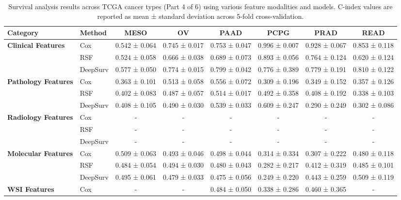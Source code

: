 \begin{sidewaystable}[htbp]
    \centering
    \caption{Survival analysis results across TCGA cancer types (Part 4 of 6) using various feature modalities and models. C-index values are reported as mean ± standard deviation across 5-fold cross-validation.}
    \label{tab:survival_results_4}
    \begin{tabular}{@{}llcccccc@{}}
        \toprule
        \textbf{Category} & \textbf{Method} & \textbf{MESO} & \textbf{OV} & \textbf{PAAD} & \textbf{PCPG} & \textbf{PRAD} & \textbf{READ} \\
        \midrule
        \multirow{3}{*}{\textbf{Clinical Features}} & Cox & 0.542 ± 0.064 & 0.745 ± 0.017 & 0.753 ± 0.047 & 0.996 ± 0.007 & 0.928 ± 0.067 & 0.853 ± 0.118 \\
        & RSF & 0.524 ± 0.058 & 0.666 ± 0.038 & 0.689 ± 0.073 & 0.893 ± 0.056 & 0.764 ± 0.124 & 0.620 ± 0.124 \\
        & DeepSurv & 0.577 ± 0.050 & 0.774 ± 0.015 & 0.799 ± 0.042 & 0.776 ± 0.389 & 0.779 ± 0.191 & 0.810 ± 0.122 \\
        \midrule
        \multirow{3}{*}{\textbf{Pathology Features}} & Cox & 0.363 ± 0.101 & 0.513 ± 0.058 & 0.556 ± 0.072 & 0.309 ± 0.196 & 0.349 ± 0.152 & 0.357 ± 0.126 \\
        & RSF & 0.402 ± 0.083 & 0.487 ± 0.057 & 0.514 ± 0.017 & 0.492 ± 0.358 & 0.408 ± 0.192 & 0.338 ± 0.103 \\
        & DeepSurv & 0.408 ± 0.105 & 0.490 ± 0.030 & 0.539 ± 0.033 & 0.609 ± 0.247 & 0.290 ± 0.249 & 0.302 ± 0.086 \\
        \midrule
        \multirow{3}{*}{\textbf{Radiology Features}} & Cox & - & - & - & - & - & - \\
        & RSF & - & - & - & - & - & - \\
        & DeepSurv & - & - & - & - & - & - \\
        \midrule
        \multirow{3}{*}{\textbf{Molecular Features}} & Cox & 0.509 ± 0.063 & 0.493 ± 0.046 & 0.498 ± 0.044 & 0.314 ± 0.334 & 0.307 ± 0.222 & 0.480 ± 0.118 \\
        & RSF & 0.484 ± 0.054 & 0.494 ± 0.030 & 0.480 ± 0.043 & 0.282 ± 0.217 & 0.412 ± 0.319 & 0.485 ± 0.101 \\
        & DeepSurv & 0.495 ± 0.061 & 0.479 ± 0.033 & 0.475 ± 0.056 & 0.249 ± 0.220 & 0.443 ± 0.259 & 0.509 ± 0.119 \\
        \midrule
        \multirow{3}{*}{\textbf{WSI Features}} & Cox & - & - & 0.484 ± 0.050 & 0.338 ± 0.286 & 0.460 ± 0.365 & - \\

\end{tabular}
\end{sidewaystable}
